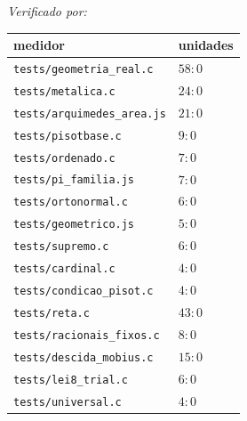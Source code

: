\documentclass[11pt,a4paper]{article}
\newcommand{\code}[1]{\texttt{\small #1}}
\begin{document}
\medskip
\noindent\emph{Verificado por:}
\begin{center}\small
\begin{tabular}{@{}ll@{}}
\toprule
medidor & unidades \\
\midrule
\code{tests/geometria\_real.c}    & $58{:}0$ \\
\code{tests/metalica.c}           & $24{:}0$ \\
\code{tests/arquimedes\_area.js}  & $21{:}0$ \\
\code{tests/pisotbase.c}          & $9{:}0$ \\
\code{tests/ordenado.c}           & $7{:}0$ \\
\code{tests/pi\_familia.js}       & $7{:}0$ \\
\code{tests/ortonormal.c}         & $6{:}0$ \\
\code{tests/geometrico.js}        & $5{:}0$ \\
\midrule
\code{tests/supremo.c}            & $6{:}0$ \\
\code{tests/cardinal.c}           & $4{:}0$ \\
\code{tests/condicao\_pisot.c}    & $4{:}0$ \\
\code{tests/reta.c}              & $43{:}0$ \\
\code{tests/racionais\_fixos.c}   & $8{:}0$ \\
\code{tests/descida\_mobius.c}    & $15{:}0$ \\
\code{tests/lei8\_trial.c}       & $6{:}0$ \\
\code{tests/universal.c}          & $4{:}0$ \\
\bottomrule
\end{tabular}
\end{center}
\end{document}
